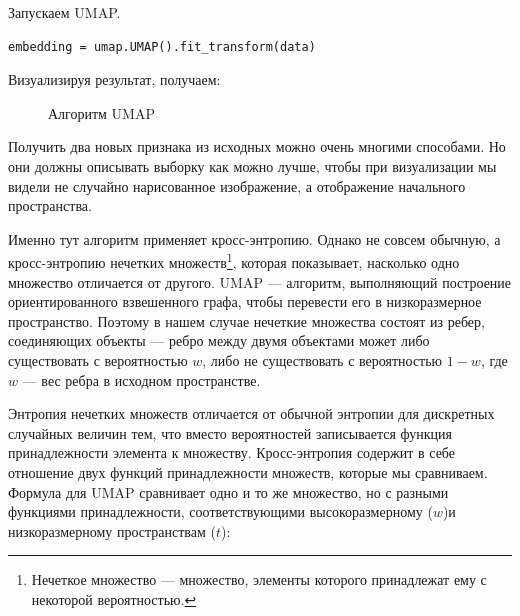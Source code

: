 Запускаем UMAP.
\begin{verbatim}
embedding = umap.UMAP().fit_transform(data)
\end{verbatim}

Визуализируя результат, получаем:

\begin{figure}[bh]
	\noindent{}
	\caption{Алгоритм UMAP}
	\label{figCurves}
\end{figure} 

Получить два новых признака из исходных можно очень многими способами. Но они должны описывать выборку как можно лучше, чтобы при визуализации мы видели не случайно нарисованное изображение, а отображение начального пространства.

Именно тут алгоритм применяет кросс-энтропию. Однако не совсем обычную, а кросс-энтропию нечетких множеств\footnote{Нечеткое множество --- множество, элементы которого принадлежат ему с некоторой вероятностью.}, которая показывает, насколько одно множество отличается от другого. UMAP --- алгоритм, выполняющий построение ориентированного взвешенного графа, чтобы перевести его в низкоразмерное пространство. Поэтому в нашем случае нечеткие множества состоят из ребер, соединяющих объекты --- ребро между двумя объектами может либо существовать с вероятностью $w$, либо не существовать с вероятностью $1-w$, где $w$ --- вес ребра в исходном пространстве.

Энтропия нечетких множеств отличается от обычной энтропии для дискретных случайных величин тем, что вместо вероятностей записывается функция принадлежности элемента к множеству. Кросс-энтропия содержит в себе отношение двух функций принадлежности множеств, которые мы сравниваем. Формула для UMAP сравнивает одно и то же множество, но с разными функциями принадлежности, соответствующими высокоразмерному ($w$)и низкоразмерному пространствам ($t$):

